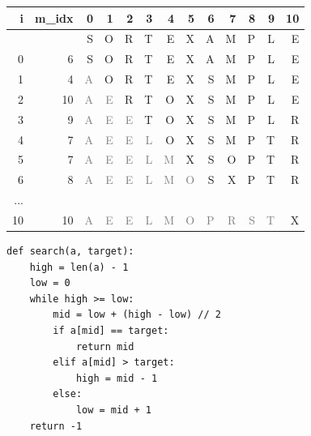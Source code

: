 \documentclass[aspectratio=169, 14pt]{beamer}
\begin{document}
\begin{frame}

    \begin{table}
        \begin{tabular}{rrrrrrrrrrrrr}
          \toprule
          i & m\_idx & 0 & 1 & 2 & 3 & 4 & 5 & 6 & 7 & 8 & 9 & 10 \\
          \midrule
          & & S & O & R & T & E & X & A & M & P & L & E \\
          0 & 6 & S & O & R & T & E & X & \alert{A} & M & P & L & E \\
          1 & 4 & \textcolor{gray}{A} & O & R & T & \alert{E} & X & S & M & P & L & E \\ 
          2 & 10 & \textcolor{gray}{A} & \textcolor{gray}{E} & R & T & O & X & S & M & P & L & \alert{E} \\
          3 & 9 & \textcolor{gray}{A} & \textcolor{gray}{E} & \textcolor{gray}{E} & T & O & X & S & M & P & \alert{L} & R \\
          4 & 7 & \textcolor{gray}{A} & \textcolor{gray}{E} & \textcolor{gray}{E} & \textcolor{gray}{L} & O & X & S & \alert{M} & P & T & R \\
          5 & 7 & \textcolor{gray}{A} & \textcolor{gray}{E} & \textcolor{gray}{E} & \textcolor{gray}{L} & \textcolor{gray}{M} & X & S & \alert{O} & P & T & R \\
          6 & 8 & \textcolor{gray}{A} & \textcolor{gray}{E} & \textcolor{gray}{E} & \textcolor{gray}{L} & \textcolor{gray}{M} & \textcolor{gray}{O} & S & X & \alert{P} & T & R \\ 
          ... \\
          10 & 10 & \textcolor{gray}{A} & \textcolor{gray}{E} & \textcolor{gray}{E} & \textcolor{gray}{L} & \textcolor{gray}{M} & \textcolor{gray}{O} & \textcolor{gray}{P} & \textcolor{gray}{R} & \textcolor{gray}{S} & \textcolor{gray}{T} & \alert{X} \\ 
          \bottomrule
        \end{tabular}
    \end{table}

\end{frame}

\begin{frame}[fragile]
\begin{verbatim}
def search(a, target):
    high = len(a) - 1
    low = 0
    while high >= low:
        mid = low + (high - low) // 2
        if a[mid] == target:
            return mid
        elif a[mid] > target:
            high = mid - 1
        else:
            low = mid + 1
    return -1  
\end{verbatim}    

\end{frame}
\end{document}
